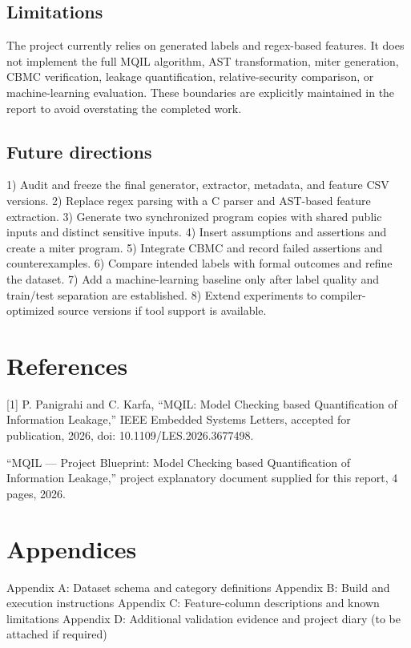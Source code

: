 \documentclass[12pt,a4paper,oneside]{report}
\begin{document}
\section{Limitations}
The project currently relies on generated labels and regex-based features. It does not implement the full MQIL algorithm, AST transformation, miter generation, CBMC verification, leakage quantification, relative-security comparison, or machine-learning evaluation. These boundaries are explicitly maintained in the report to avoid overstating the completed work.\par

\section{Future directions}
1) Audit and freeze the final generator, extractor, metadata, and feature CSV versions. 2) Replace regex parsing with a C parser and AST-based feature extraction. 3) Generate two synchronized program copies with shared public inputs and distinct sensitive inputs. 4) Insert assumptions and assertions and create a miter program. 5) Integrate CBMC and record failed assertions and counterexamples. 6) Compare intended labels with formal outcomes and refine the dataset. 7) Add a machine-learning baseline only after label quality and train/test separation are established. 8) Extend experiments to compiler-optimized source versions if tool support is available.\par

\chapter*{References}
[1] P. Panigrahi and C. Karfa, ``MQIL: Model Checking based Quantification of Information Leakage,'' IEEE Embedded Systems Letters, accepted for publication, 2026, doi: 10.1109/LES.2026.3677498.\par
[2] ``MQIL --- Project Blueprint: Model Checking based Quantification of Information Leakage,'' project explanatory document supplied for this report, 4 pages, 2026.\par

\chapter*{Appendices}
\noindent Appendix A: Dataset schema and category definitions
Appendix B: Build and execution instructions
Appendix C: Feature-column descriptions and known limitations
Appendix D: Additional validation evidence and project diary (to be attached if required)\par
\end{document}

